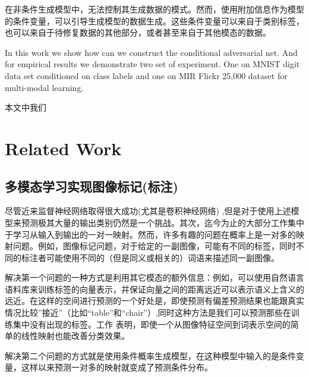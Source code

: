 \documentclass{article} %
\begin{document}
在非条件生成模型中，无法控制其生成数据的模式。然而，使用附加信息作为模型的条件变量，可以引导生成模型的数据生成。这些条件变量可以来自于类别标签，也可以来自于待修复数据的其他部分\cite{goodfellow2013multi}，或者甚至来自于其他模态的数据。

In this work we show how can we construct the conditional adversarial net. And for empirical
results we demonstrate two set of experiment. One on MNIST digit data set conditioned on class
labels and one on MIR Flickr 25,000 dataset \cite{huiskes08} for multi-modal learning.

本文中我们

\section{Related Work}

\subsection{多模态学习实现图像标记(标注)}

尽管近来监督神经网络取得很大成功(尤其是卷积神经网络) \cite{Krizhevsky-2012, szegedy2014going},但是对于使用上述模型来预测极其大量的输出类别仍然是一个挑战。其次，迄今为止的大部分工作集中于学习从输入到输出的一对一映射。然而，许多有趣的问题在概率上是一对多的映射问题。例如，图像标记问题，对于给定的一副图像，可能有不同的标签，同时不同的标注者可能使用不同的（但是同义或相关的）词语来描述同一副图像。

解决第一个问题的一种方式是利用其它模态的额外信息：例如，可以使用自然语言语料库来训练标签的向量表示，并保证向量之间的距离远近可以表示语义上含义的远近。在这样的空间进行预测的一个好处是，即使预测有偏差预测结果也能跟真实情况比较”接近”（比如“table”和“chair”）,同时这种方法是我们可以预测那些在训练集中没有出现的标签。工作 \cite{frome2013devise} 表明，即使一个从图像特征空间到词表示空间的简单的线性映射也能改善分类效果。

解决第二个问题的方式就是使用条件概率生成模型，在这种模型中输入的是条件变量，这样以来预测一对多的映射就变成了预测条件分布。

\end{document}
